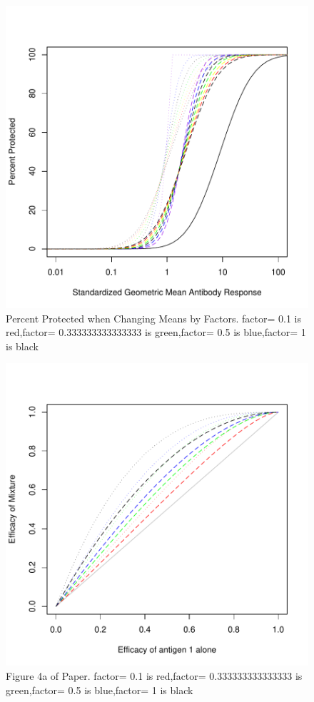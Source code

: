 \documentclass{article}[12pt]
\begin{document}
\begin{figure}
\caption{Percent Protected when Changing Means by Factors.
factor= 0.1  is  red,factor= 0.333333333333333  is  green,factor= 0.5  is  blue,factor= 1  is  black
 \label{fig:logmean.pp.mu} }
\includegraphics{hbimdetails-figLogmeanPPMu}
\end{figure}




\begin{figure}
\caption{Figure 4a of Paper.
factor= 0.1  is  red,factor= 0.333333333333333  is  green,factor= 0.5  is  blue,factor= 1  is  black
 \label{fig:4a} }
\includegraphics{hbimdetails-fig4a}
\end{figure}
\end{document}
